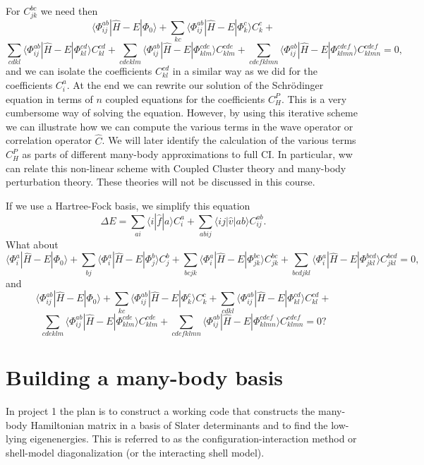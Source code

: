 \documentclass[graybox,sectrefs,envcountresetchap,open=right]{svmonodo}
\begin{document}
For $C_{jk}^{bc}$ we need then
\[
\langle \Phi_{ij}^{ab} | \hat{H} -E| \Phi_0\rangle + \sum_{kc}\langle \Phi_{ij}^{ab} | \hat{H} -E|\Phi_{k}^{c} \rangle C_{k}^{c}+
\]
\[
\sum_{cdkl}\langle \Phi_{ij}^{ab} | \hat{H} -E|\Phi_{kl}^{cd} \rangle C_{kl}^{cd}+\sum_{cdeklm}\langle \Phi_{ij}^{ab} | \hat{H} -E|\Phi_{klm}^{cde} \rangle C_{klm}^{cde}+\sum_{cdefklmn}\langle \Phi_{ij}^{ab} | \hat{H} -E|\Phi_{klmn}^{cdef} \rangle C_{klmn}^{cdef}=0,
\]
and we can isolate the coefficients $C_{kl}^{cd}$ in a similar way as we did for the coefficients $C_{i}^{a}$. 
At the end we can rewrite our solution of the Schr\"odinger equation in terms of $n$ coupled equations for the coefficients $C_H^P$.
This is a very cumbersome way of solving the equation. However, by using this iterative scheme we can illustrate how we can compute the
various terms in the wave operator or correlation operator $\hat{C}$. We will later identify the calculation of the various terms $C_H^P$
as parts of different many-body approximations to full CI. In particular, ww can  relate this non-linear scheme with Coupled Cluster theory and
many-body perturbation theory. These theories will not be discussed in this course.


If we use a Hartree-Fock basis, we simplify this equation
\[
\Delta E=\sum_{ai}\langle i| \hat{f}|a \rangle C_{i}^{a}+
\sum_{abij}\langle ij | \hat{v}| ab \rangle C_{ij}^{ab}.
\]
What about
\[
\langle \Phi_i^a | \hat{H} -E| \Phi_0\rangle + \sum_{bj}\langle \Phi_i^a | \hat{H} -E|\Phi_{j}^{b} \rangle C_{j}^{b}+
\sum_{bcjk}\langle \Phi_i^a | \hat{H} -E|\Phi_{jk}^{bc} \rangle C_{jk}^{bc}+
\sum_{bcdjkl}\langle \Phi_i^a | \hat{H} -E|\Phi_{jkl}^{bcd} \rangle C_{jkl}^{bcd}=0,
\]
and
\[
\langle \Phi_{ij}^{ab} | \hat{H} -E| \Phi_0\rangle + \sum_{kc}\langle \Phi_{ij}^{ab} | \hat{H} -E|\Phi_{k}^{c} \rangle C_{k}^{c}+
\sum_{cdkl}\langle \Phi_{ij}^{ab} | \hat{H} -E|\Phi_{kl}^{cd} \rangle C_{kl}^{cd}+
\]
\[
\sum_{cdeklm}\langle \Phi_{ij}^{ab} | \hat{H} -E|\Phi_{klm}^{cde} \rangle C_{klm}^{cde}+\sum_{cdefklmn}\langle \Phi_{ij}^{ab} | \hat{H} -E|\Phi_{klmn}^{cdef} \rangle C_{klmn}^{cdef}=0?
\]







\section{Building a many-body basis}


In project 1 the plan  is to construct a working code that constructs the 
many-body Hamiltonian matrix in a basis of Slater determinants and to find the low-lying eigenenergies. 
This is referred to as the configuration-interaction method or shell-model diagonalization 
(or the interacting shell model). 
\end{document}

